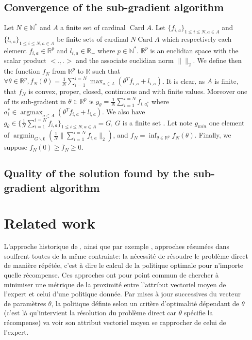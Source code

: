 \documentclass{article}
\newcommand{\argmax}{\operatorname*{argmax}} %
\newcommand{\argmin}{\operatorname*{argmin}}
\newcommand{\card}{\operatorname*{Card}}
\begin{document}
\subsection{Convergence of the sub-gradient algorithm}
Let $N\in\mathbb{N}^*$ and $A$ a finite set of cardinal $\card{A}$.
Let $\{f_{i,a}\}_{1\leq i \leq N,a\in A}$ and $\{l_{i,a}\}_{1\leq i \leq N,a\in A}$ be finite sets of cardinal $N\card{A}$ which respectively each element $f_{i,a}\in\mathbb{R}^p$ and $l_{i,a}\in\mathbb{R_+}$  where $p\in\mathbb{N}^*$. $\mathbb{R}^p$ is an euclidian space with the scalar product $<.,.>$ and the associate euclidian norm $\|\|_2$. 
We define then the function $f_N$ from $\mathbb{R}^p$ to $\mathbb{R}$ such that $\forall \theta\in\mathbb{R}^p, f_N(\theta)=\frac{1}{N}\sum_{i=1}^{i=N}\max_{a\in A}(\theta^Tf_{i,a}+l_{i,a})$. It is clear, as $A$ is finite, that $f_N$ is convex, proper, closed, continuous and with finite values.
Moreover one of its sub-gradient in $\theta\in\mathbb{R}^p$ is $g_{\theta}=\frac{1}{N}\sum_{i=1}^{i=N}f_{i,a_i^*}$ where $a_i^*\in\argmax_{a \in A}(\theta^Tf_{i,a}+l_{i,a})$. We also have $g_{\theta}\in\{\frac{1}{N}\sum_{i=1}^{i=N}f_{i,a}\}_{1\leq i \leq N,a\in A}=G$, $G$ is a finite set . Let note $g_{min}$ one element of $\argmin_{G\backslash{0}}(\frac{1}{N}\|\sum_{i=1}^{i=N}f_{i,a}\|_2)$, and
$\overline{f}_N=\inf_{\theta\in\mathbb{R}^p}f_N(\theta)$. Finally, we suppose $f_N(0)\geq \overline{f}_N\geq0$. 
\subsection{Quality of the solution found by the sub-gradient algorithm}
\section{Related work}
\label{biblio.sec}
L'approche historique de \cite{ng2000algorithms}, ainsi que par exemple \cite{abbeel2004apprenticeship,syed2008apprenticeship,syed2008game, ziebart2008maximum}, approches résumées dans \cite{neu2009training} souffrent toutes de la même contrainte: la nécessité de résoudre le problème direct de manière répétée, c'est à dire le calcul de la politique optimale pour n'importe quelle récompense. Ces approches ont pour point commun de chercher à minimiser une métrique de la proximité entre l'attribut vectoriel moyen de \mbox{l'expert} et celui d'une politique donnée. Par mises à jour successives du vecteur de paramètres $\theta$, la politique définie selon un critère d'optimalité dépendant de $\theta$ (c'est là qu'intervient la résolution du problème direct car $\theta$ spécifie la récompense) va voir son attribut vectoriel moyen se rapprocher de celui de l'expert.\\
\end{document}
